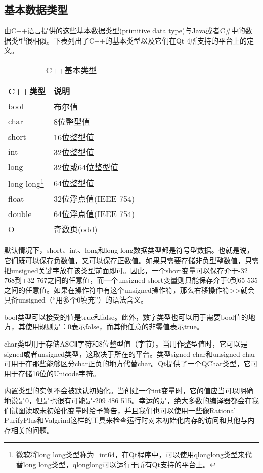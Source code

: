 \documentclass[11pt,oneside]{book}
\begin{document}
\begin{common-format}
\subsection{基本数据类型}
由C++语言提供的这些基本数据类型(primitive data type)与Java或者C\#{}中的数据类型很相似。下表列出了C++的基本类型以及它们在Qt 4所支持的平台上的定义。

\begin{minipage}{0.9\linewidth}
\begin{table}[H]
\centering
\caption{C++基本类型}
\label{tab:C++基本类型}
\medskip 
\begin{tabular}{@{}ll@{}}
\toprule
C++类型 & 说明  \\ \midrule
bool  &  布尔值 \\
char  &  8位整型值 \\
short  &  16位整型值 \\
int  &  32位整型值 \\
long  &  32位或64位整型值 \\
long long\footnote{微软将long long类型称为\_{}int64，在Qt程序中，可以使用qlonglong类型来代替long long类型，qlonglong可以运行于所有Qt支持的平台上。}  &  64位整型值 \\
float  &  32位浮点值(IEEE 754) \\
double  &  64位浮点值(IEEE 754) \\
O  & 奇数页(odd)
 \\ \bottomrule
\end{tabular}
\end{table}
\end{minipage}

默认情况下，short、int、long和long long数据类型都是符号型数据。也就是说，它们既可以保存负数值，又可以保存正数值。如果只需要存储非负型整数值，只需把unsigned关键字放在该类型前面即可。因此，一个short变量可以保存介于-32 768到+32 767之间的任意值，而一个unsigned short变量则只能保存介于0到65 535之间的任意值。如果在操作符中有这个unsigned操作符，那么右移操作符>>就会具备unsigned（“用多个0填充”）的语法含义。

bool类型可以接受的值是true和false。此外，数字类型也可以用于需要bool值的地方，其使用规则是：0表示false，而其他任意的非零值表示true。

char类型用于存储ASCⅡ字符和8位整型值（字节）。当用作整型值时，它可以是signed或者unsigned类型，这取决于所在的平台。类型signed char和unsigned char可用于在那些能够区分char正负的地方代替char。Qt提供了一个QChar类型，它可用于存储16位的Unicode字符。

内置类型的实例不会被默认初始化。当创建一个int变量时，它的值应当可以明确地说是0，但是也很有可能是-209 486 515。幸运的是，绝大多数的编译器都会在我们试图读取未初始化变量时给予警告，并且我们也可以使用一些像Rational PurifyPlus和Valgrind这样的工具来检查运行时对未初始化内存的访问和其他与内存相关的问题。


\end{common-format}
\end{document}
